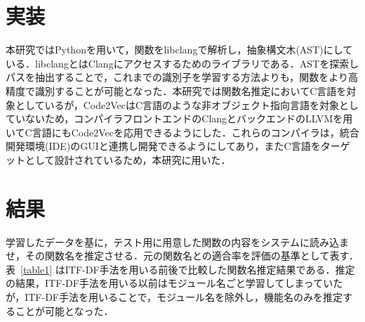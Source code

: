 \documentclass[submit,techrep,noauthor]{ipsj}
\begin{document}





\section{実装}

本研究ではPythonを用いて，関数をlibclangで解析し，抽象構文木(AST)にしている．libclangとはClangにアクセスするためのライブラリである．ASTを探索しパスを抽出することで，これまでの識別子を学習する方法よりも，関数をより高精度で識別することが可能となった．本研究では関数名推定においてC言語を対象としているが，Code2VecはC言語のような非オブジェクト指向言語を対象としていないため，コンパイラフロントエンドのClangとバックエンドのLLVMを用いてC言語にもCode2Vecを応用できるようにした．これらのコンパイラは，統合開発環境(IDE)のGUIと連携し開発できるようにしてあり，またC言語をターゲットとして設計されているため，本研究に用いた．

\section{結果}
学習したデータを基に，テスト用に用意した関数の内容をシステムに読み込ませ，その関数名を推定させる．元の関数名との適合率を評価の基準として表す．
表~\ref{table1} はITF-DF手法を用いる前後で比較した関数名推定結果である．推定の結果，ITF-DF手法を用いる以前はモジュール名ごと学習してしまっていたが，ITF-DF手法を用いることで，モジュール名を除外し，機能名のみを推定することが可能となった．
\end{document}
